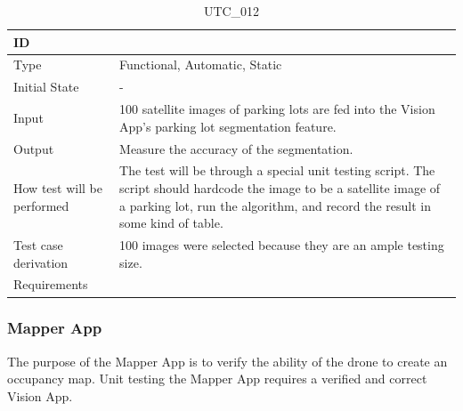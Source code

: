 \documentclass[12pt, titlepage]{article}
\begin{document}
\begin{table}[!h]
\begin{center}
\caption {UTC\_012}
\label{tab:UTC_012}
\begin{tabular}{ | m{3.2cm} | m{12.2cm} | } 
\hline
ID & \nameref{tab:UTC_012} \\ 
\hline
Type &  Functional, Automatic, Static  \\ 
\hline
Initial State & -\\ 
\hline
Input &  100 satellite images of parking lots are fed into the Vision App's parking lot segmentation feature.\\ 
\hline
Output &  Measure the accuracy of the segmentation. \\ 
\hline
How test will be performed & The test will be through a special unit testing script. The script should hardcode the image to be a satellite image of a parking lot, run the algorithm, and record the result in some kind of table. \\ 
\hline
Test case derivation & 100 images were selected because they are an ample testing size.  \\ 
\hline
Requirements & \nameref{GEN_001} \\ 
\hline
\end{tabular}
\end{center}
\end{table}

\clearpage

\subsubsection{Mapper App}

The purpose of the Mapper App is to verify the ability of the drone to create an occupancy map. Unit testing the Mapper App requires a verified and correct Vision App.
\end{document}
